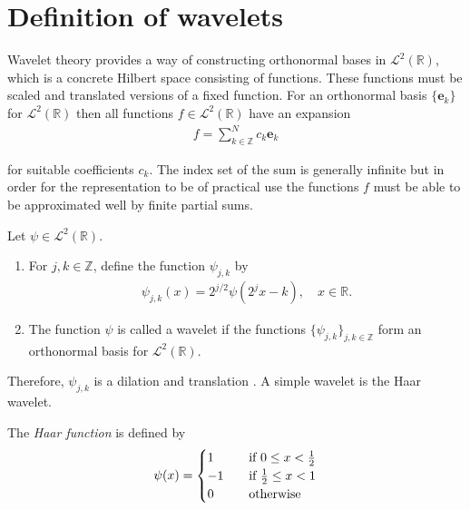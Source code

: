 \section{Definition of wavelets}
Wavelet theory provides a way of constructing orthonormal bases in $\mathcal{L}^2(\mathbb{R})$, which is a concrete Hilbert space consisting of functions. These functions must be scaled and translated versions of a fixed function. For an orthonormal basis $\{\textbf{e}_k\}$ for $\mathcal{L}^2(\mathbb{R})$ then all functions $f \in \mathcal{L}^2(\mathbb{R})$ have an expansion
\begin{align*}
f = \sum_{k\in\mathbb{Z}}^N c_k \textbf{e}_k
\end{align*}

for suitable coefficients $c_k$. The index set of the sum is generally infinite but in order for the representation to be of practical use the functions $f$ must be able to be approximated well by finite partial sums.

\begin{definition}[Wavelet]
Let $\psi \in \mathcal{L}^2(\mathbb{R})$.
\begin{enumerate}
\item For $j,k \in \mathbb{Z}$, define the function $\psi_{j,k}$ by
\begin{align*}
\psi_{j,k}(x) = 2^{j/2} \psi(2^jx-k), \quad x \in \mathbb{R}.
\end{align*}
\item The function $\psi$ is called a wavelet if the functions $\{\psi_{j,k}\}_{j,k\in\mathbb{Z}}$ form an orthonormal basis for $\mathcal{L}^2(\mathbb{R})$.
\end{enumerate}
\end{definition}

Therefore, $\psi_{j,k}$ is a dilation and translation . A simple wavelet is the Haar wavelet.

\begin{definition} \label{HaarWave}
The \textit{Haar function} is defined by
\begin{align*}
\psi(x) =
\begin{cases}
1 \quad &\textnormal{if } 0 \leq x < \frac{1}{2} \\
-1 \quad &\textnormal{if } \frac{1}{2} \leq x  < 1 \\
0 \quad &\textnormal{otherwise}
\end{cases}
\end{align*}
\end{definition}

